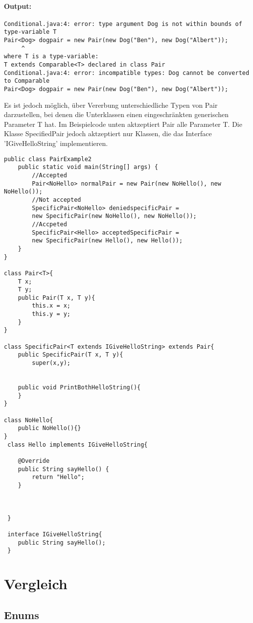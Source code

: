 \documentclass[a4paper, 1ppt]{article}
\begin{document}
\paragraph{Output:}
\begin{verbatim}
Conditional.java:4: error: type argument Dog is not within bounds of type-variable T
Pair<Dog> dogpair = new Pair(new Dog("Ben"), new Dog("Albert"));
	 ^
where T is a type-variable:
T extends Comparable<T> declared in class Pair
Conditional.java:4: error: incompatible types: Dog cannot be converted to Comparable
Pair<Dog> dogpair = new Pair(new Dog("Ben"), new Dog("Albert"));
\end{verbatim}
Es ist jedoch möglich, über Vererbung unterschiedliche Typen von Pair darzustellen, bei denen die Unterklassen einen eingeschränkten generischen Parameter T hat. Im Beispielcode unten aktzeptiert Pair alle Parameter T. Die Klasse SpecifiedPair jedoch aktzeptiert nur Klassen, die das Interface 'IGiveHelloString' implementieren.
\begin{verbatim}
public class PairExample2
    public static void main(String[] args) {
		//Accepted
        Pair<NoHello> normalPair = new Pair(new NoHello(), new NoHello());
        //Not accepted
        SpecificPair<NoHello> deniedspecificPair =
		new SpecificPair(new NoHello(), new NoHello());
        //Accpeted
        SpecificPair<Hello> acceptedSpecificPair =
		new SpecificPair(new Hello(), new Hello());
    }
}

class Pair<T>{
    T x;
    T y;
    public Pair(T x, T y){
        this.x = x;
        this.y = y;
    }
}

class SpecificPair<T extends IGiveHelloString> extends Pair{
    public SpecificPair(T x, T y){
        super(x,y);


    public void PrintBothHelloString(){
    }
}

class NoHello{
    public NoHello(){}
}
 class Hello implements IGiveHelloString{

    @Override
    public String sayHello() {
        return "Hello";
    }

   

 }

 interface IGiveHelloString{
    public String sayHello();
 }
\end{verbatim}
\newpage
\section{Vergleich}
\subsection{Enums}
\end{document}
